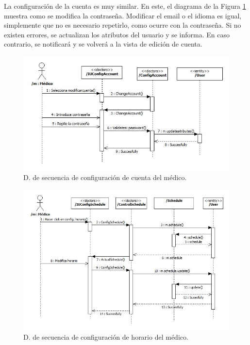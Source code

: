 					La configuración de la cuenta es muy similar. En este, el diagrama de la Figura \ref{fig:cont_doc_config_account} muestra como se modifica la contraseña. Modificar el email o el idioma es igual, simplemente que no es necesario repetirlo, como ocurre con la contraseña. Si no existen errores, se actualizan los atributos del usuario y se informa. En caso contrario, se notificará y se volverá a la vista de edición de cuenta.
					
					\begin{figure}[H]
					  \centering
					    \includegraphics[width=14cm]{img/jpg/secuencia/2_doc_config_account.jpg}
					  \caption{D. de secuencia de configuración de cuenta del médico.}
					  \label{fig:cont_doc_config_account}
					\end{figure}
				
				\begin{figure}[H]
				  \centering
				    \includegraphics[width=15cm]{img/jpg/secuencia/3_doc_config_schedule.jpg}
				  \caption{D. de secuencia de configuración de horario del médico.}
				  \label{fig:cont_doc_config_schedule}
				\end{figure}
				
